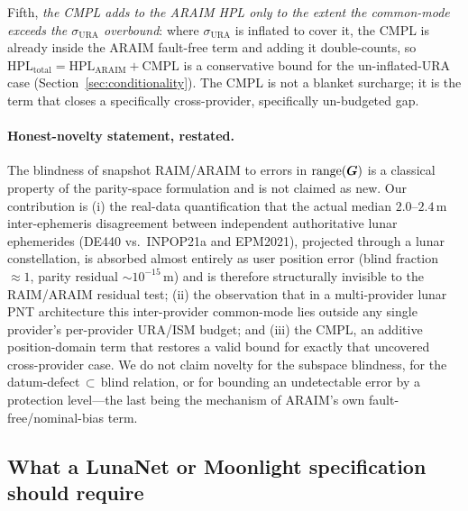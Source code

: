 Fifth, \emph{the CMPL adds to the ARAIM HPL only to the extent the common-mode exceeds
the $\sigma_{\mathrm{URA}}$ overbound}: where $\sigma_{\mathrm{URA}}$ is inflated to cover
it, the CMPL is already inside the ARAIM fault-free term and adding it double-counts, so
$\mathrm{HPL}_{\mathrm{total}}=\mathrm{HPL}_{\mathrm{ARAIM}}+\mathrm{CMPL}$ is a
conservative bound for the un-inflated-URA case (Section~\ref{sec:conditionality}). The
CMPL is not a blanket surcharge; it is the term that closes a specifically
cross-provider, specifically un-budgeted gap.

\paragraph{Honest-novelty statement, restated.}
The blindness of snapshot RAIM/ARAIM to errors in $\operatorname{range}(\bm{G})$ is a classical property
of the parity-space formulation and is not claimed as new. Our contribution is (i) the
real-data quantification that the actual median $2.0$--$2.4\,$m inter-ephemeris
disagreement between independent authoritative lunar ephemerides (DE440 vs.\ INPOP21a
and EPM2021), projected through a lunar constellation, is absorbed almost entirely as
user position error (blind fraction $\approx1$, parity residual $\sim\!10^{-15}\,$m) and
is therefore structurally invisible to the RAIM/ARAIM residual test; (ii) the
observation that in a multi-provider lunar PNT architecture this inter-provider
common-mode lies outside any single provider's per-provider URA/ISM budget; and (iii)
the CMPL, an additive position-domain term that restores a valid bound for exactly that
uncovered cross-provider case. We do not claim novelty for the subspace blindness, for
the datum-defect$\,\subset\,$blind relation, or for bounding an undetectable error by a
protection level---the last being the mechanism of ARAIM's own fault-free/nominal-bias
term.

\subsection{What a LunaNet or Moonlight specification should require}
\label{sec:spec}

